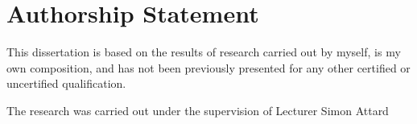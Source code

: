 \newpage

\chapter*{\centering Authorship Statement}
\vspace{-0.2in}

\begin{spacing}{1.5}
\setlength{\parskip}{0.3in}
\setlength{\parindent}{0in}


This dissertation is based on the results of research carried out by myself, is my
own composition, and has not been previously presented for any other certified
or uncertified qualification.

The research was carried out under the supervision of Lecturer Simon Attard

\vspace{2.5cm}

\begin{center}
	\makebox[4cm]{\dotfill}  \hfill \makebox[4cm]{\dotfill}\\
	      \hfill {}
\end{center}
\end{spacing}
\newpage
